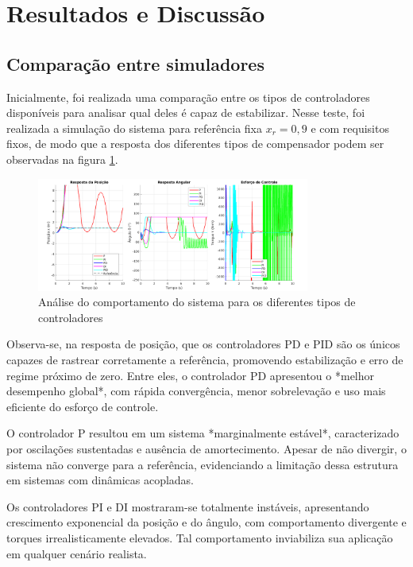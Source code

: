 \documentclass[a4paper, 12pt]{article} %
\begin{document}
\section{Resultados e Discussão}

\subsection{Comparação entre simuladores}

Inicialmente, foi realizada uma comparação entre os tipos de controladores disponíveis para analisar qual deles é capaz de estabilizar. Nesse teste, foi realizada a simulação do sistema para referência fixa $x_r = 0,9$ e com requisitos fixos, de modo que a resposta dos diferentes tipos de compensador podem ser observadas na figura \ref{fig:resultado-controladores}.

\begin{figure}[H]
    \centering
    \includegraphics[width=0.8\textwidth]{images/comparar-controlador.png}
    \caption{\centering Análise do comportamento do sistema para os diferentes tipos de controladores}
    \label{fig:resultado-controladores}
\end{figure}

Observa-se, na resposta de posição, que os controladores PD e PID são os únicos capazes de rastrear corretamente a referência, promovendo estabilização e erro de regime próximo de zero. Entre eles, o controlador PD apresentou o *melhor desempenho global*, com rápida convergência, menor sobrelevação e uso mais eficiente do esforço de controle.

O controlador P resultou em um sistema *marginalmente estável*, caracterizado por oscilações sustentadas e ausência de amortecimento. Apesar de não divergir, o sistema não converge para a referência, evidenciando a limitação dessa estrutura em sistemas com dinâmicas acopladas.

Os controladores PI e DI mostraram-se totalmente instáveis, apresentando crescimento exponencial da posição e do ângulo, com comportamento divergente e torques irrealisticamente elevados. Tal comportamento inviabiliza sua aplicação em qualquer cenário realista.
\end{document}
